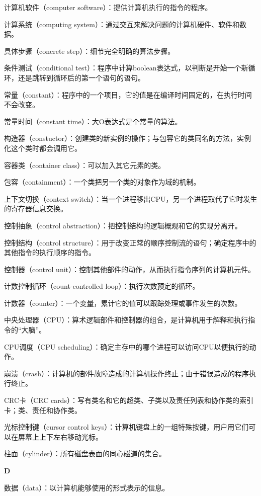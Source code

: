 计算机软件（computer software）：提供计算机执行的指令的程序。

计算系统（computing system）：通过交互来解决问题的计算机硬件、软件和数据。

具体步骤（concrete step）：细节完全明确的算法步骤。

条件测试（conditional test）：程序中计算boolean表达式，以判断是开始一个新循环，还是跳转到循环后的第一个语句的语句。

常量（constant）：程序中的一个项目，它的值是在编译时间固定的，在执行时间不会改变。

常量时间（constant time）：大O表达式是个常量的算法。

构造器（constuctor）：创建类的新实例的操作；与包容它的类同名的方法，实例化这个类时都会调用它。

容器类（container class）：可以加入其它元素的类。

包容（containment）：一个类把另一个类的对象作为域的机制。

上下文切换（context switch）：当一个进程移出CPU，另一个进程取代了它时发生的寄存器信息交换。

控制抽象（control abstraction）：把控制结构的逻辑概观和它的实现分离开。

控制结构（control structure）：用于改变正常的顺序控制流的语句；确定程序中的其他指令的执行顺序的指令。

控制器（control unit）：控制其他部件的动作，从而执行指令序列的计算机元件。

计数控制循环（count-controlled loop）：执行次数预定的循环。

计数器（counter）：一个变量，累计它的值可以跟踪处理或事件发生的次数。

中央处理器（CPU）：算术逻辑部件和控制器的组合，是计算机用于解释和执行指令的“大脑”。

CPU调度（CPU scheduling）：确定主存中的哪个进程可以访问CPU以便执行的动作。

崩溃（crash）：计算机的部件故障造成的计算机操作终止；由于错误造成的程序执行终止。

CRC卡（CRC cards）：写有类名和它的超类、子类以及责任列表和协作类的索引卡；类、责任和协作类。

光标控制键（cursor control keys）：计算机键盘上的一组特殊按键，用户用它们可以在屏幕上上下左右移动光标。

柱面（cylinder）：所有磁盘表面的同心磁道的集合。

\textbf{D}

数据（data）：以计算机能够使用的形式表示的信息。

